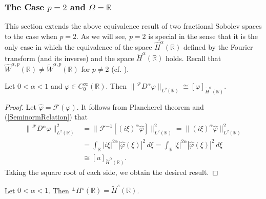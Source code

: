 \documentclass[leqno,final]{siamltex}
\numberwithin{equation}{section}
\renewcommand{\(}{\bigl(}
\renewcommand{\)}{\bigr)}
\newcommand{\R}{\mathbb{R}}
\begin{document}
    
    \subsubsection{\bf The Case $p=2$ and $\Omega = \R$}\label{sec-4.6.3}
        This section extends the above equivalence result of two fractional Sobolev spaces to the case when $p=2$. 
        As we will see, $p=2$ is special in the sense that it is the only case in which the equivalence of the space $\widehat{H}^{\alpha}(\R)$ defined by the Fourier transform (and its inverse) and the space $\widetilde{H}^{\alpha}(\R)$ holds. Recall that $\widehat{W}^{\alpha,p}(\R) \neq \widetilde{W}^{\alpha,p}(\R)$ for $p\neq2$ (cf. \cite{Adams,Brezis}).
     

        \begin{lemma}\label{equivalence_seminorms}
           Let $0 < \alpha <1$ and $\varphi \in C^{\infty}_{0}(\R)$. Then $\|{^{\mathcal{F}}}{D}{^{\alpha}} \varphi \|_{L^{2}(\R)} \cong [ \varphi ]_{\widetilde{H}^{\alpha}(\R)}$.
        \end{lemma}
        
        \begin{proof}
            Let $\hat{\varphi}=\mathcal{F}(\varphi)$. It follows from Plancherel theorem and (\ref{SeminormRelation}) that
            \begin{align*}
                \|{^{\mathcal{F}}}{D}{^{\alpha}} \varphi \|_{L^{2}(\R)}^{2} &= \|\mathcal{F}^{-1} [ (i\xi)^{\alpha} \hat{\varphi} ] \|_{L^{2}(\R)}^{2} 
                = \|(i\xi)^{\alpha} \hat{\varphi} \|_{L^{2}(\R)}^{2}  \\ 
                & = \int_{\R} |i\xi|^{2\alpha} |\hat{\varphi}(\xi)|^{2} \,d\xi 
                = \int_{\R} |\xi|^{2\alpha} |\hat{\varphi}(\xi)|^{2}\,d\xi  \\
                &\cong
                [u]_{\widetilde{H}^{\alpha}(\R)}.
            \end{align*}
            Taking the square root of each side, we obtain the desired result. 
        \end{proof}
    

        \begin{theorem}
            Let $0 < \alpha <1$. Then ${^{\pm}}{{H}}{^{s}} (\R) = \widetilde{H}^{s}(\R)$. 
        \end{theorem}
        
\end{document}
